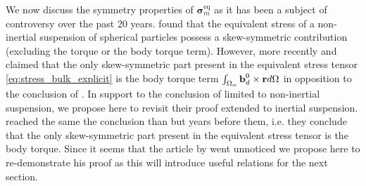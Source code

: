 We now discuss the symmetry properties of $\bm\sigma^\text{eq}_m$ as it has been a subject of controversy over the past 20 years.
\citet{prosperetti2006stress} found that the equivalent stress of a non-inertial suspension of spherical particles possess a skew-symmetric contribution (excluding the torque or the body torque term). 
However, more recently \citet{zhou2020lamb} and \citet{dolata2020heterogeneous} claimed that the only skew-symmetric part present in the equivalent stress tensor \eqref{eq:stress_bulk_explicit} is the body torque term $\int_{\Omega_{\alpha}} \textbf{b}_d^0 \times \textbf{r} d\Omega$ in opposition to the conclusion of \citep{prosperetti2006stress}.
In support to the conclusion of  \citet{dolata2020heterogeneous} limited to non-inertial suspension, we propose here to revisit their proof extended to inertial suspension. 
\citet{lhuillier1996contribution} reached the same the conclusion than \citet{dolata2020heterogeneous} but years before them, i.e. they conclude that the only skew-symmetric part present in the equivalent stress tensor is the body torque. 
Since it seems that the article by \citet{lhuillier1996contribution} went unnoticed we propose here to re-demonstrate his proof as this will introduce useful relations for the next section. 

